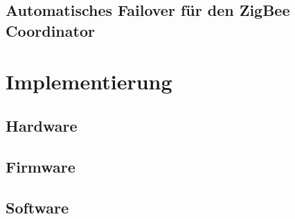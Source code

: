 \subsection{Automatisches Failover für den ZigBee Coordinator}

\section{Implementierung}

\subsection{Hardware}

\subsection{Firmware}

\subsection{Software}



